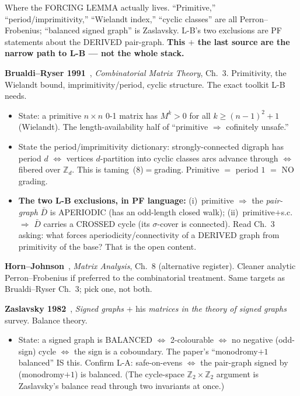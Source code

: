 Where the FORCING LEMMA actually lives. ``Primitive,''
``period/imprimitivity,'' ``Wielandt index,'' ``cyclic classes'' are all
Perron--Frobenius; ``balanced signed graph'' is Zaslavsky. L-B's two exclusions are
PF statements about the DERIVED pair-graph. \textbf{This $+$ the last source are the
narrow path to L-B --- not the whole stack.}

\textbf{Brualdi--Ryser 1991}~\cite{BrualdiRyser1991}, \emph{Combinatorial Matrix
Theory}, Ch.~3. Primitivity, the Wielandt bound, imprimitivity/period, cyclic
structure. The exact toolkit L-B needs.
\begin{itemize}[itemsep=1pt]
  \item State: a primitive $n\times n$ 0-1 matrix has $M^k>0$ for all
    $k\ge(n-1)^2+1$ (Wielandt). The length-availability half of ``primitive
    $\Rightarrow$ cofinitely unsafe.''
  \item State the period/imprimitivity dictionary: strongly-connected digraph has
    period $d$ $\Leftrightarrow$ vertices $d$-partition into cyclic classes arcs
    advance through $\Leftrightarrow$ fibered over $\mathbb Z_d$. This is
    taming~(8)$=$grading. Primitive $=$ period $1$ $=$ NO grading.
  \item \textbf{The two L-B exclusions, in PF language:} (i)~primitive $\Rightarrow$
    the \emph{pair-graph} $\bar D$ is APERIODIC (has an odd-length closed walk);
    (ii)~primitive$+$s.c.\ $\Rightarrow$ $\bar D$ carries a CROSSED cycle (its
    $\sigma$-cover is connected). Read Ch.~3 asking: what forces
    aperiodicity/connectivity of a DERIVED graph from primitivity of the base? That
    is the open content.
\end{itemize}

\textbf{Horn--Johnson}~\cite{HornJohnson}, \emph{Matrix Analysis}, Ch.~8
(alternative register). Cleaner analytic Perron--Frobenius if preferred to the
combinatorial treatment. Same targets as Brualdi--Ryser Ch.~3; pick one, not both.

\textbf{Zaslavsky 1982}~\cite{Zaslavsky1982}, \emph{Signed graphs} $+$ his
\emph{matrices in the theory of signed graphs} survey. Balance theory.
\begin{itemize}[itemsep=1pt]
  \item State: a signed graph is BALANCED $\Leftrightarrow$ 2-colourable
    $\Leftrightarrow$ no negative (odd-sign) cycle $\Leftrightarrow$ the sign is a
    coboundary. The paper's ``monodromy$+1$ balanced'' IS this. Confirm L-A:
    safe-on-evens $\Leftrightarrow$ the pair-graph signed by (monodromy$+1$) is
    balanced. (The cycle-space $\mathbb Z_2\times\mathbb Z_2$ argument is
    Zaslavsky's balance read through two invariants at once.)
\end{itemize}

